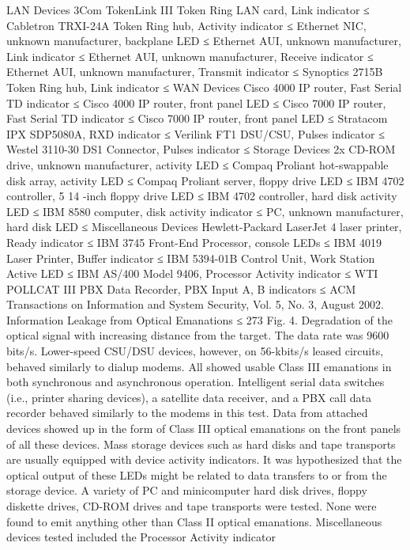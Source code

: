 LAN Devices 
3Com TokenLink III Token Ring LAN card, Link indicator ≤ Cabletron TRXI-24A Token Ring hub, Activity indicator ≤ Ethernet NIC, unknown manufacturer, backplane LED ≤ Ethernet AUI, unknown manufacturer, Link indicator ≤ Ethernet AUI, unknown manufacturer, Receive indicator ≤ Ethernet AUI, unknown manufacturer, Transmit indicator ≤ Synoptics 2715B Token Ring hub, Link indicator ≤ 
WAN Devices 
Cisco 4000 IP router, Fast Serial TD indicator ≤ Cisco 4000 IP router, front panel LED ≤ Cisco 7000 IP router, Fast Serial TD indicator ≤ Cisco 7000 IP router, front panel LED ≤ Stratacom IPX SDP5080A, RXD indicator ≤ Verilink FT1 DSU/CSU, Pulses indicator ≤ Westel 3110-30 DS1 Connector, Pulses indicator ≤ 
Storage Devices 
2x CD-ROM drive, unknown manufacturer, activity LED ≤ Compaq Proliant hot-swappable disk array, activity LED ≤ Compaq Proliant server, floppy drive LED ≤ 
IBM 4702 controller, 5 14 
-inch floppy drive LED ≤ IBM 4702 controller, hard disk activity LED ≤ IBM 8580 computer, disk activity indicator ≤ PC, unknown manufacturer, hard disk LED ≤ 
Miscellaneous Devices 
Hewlett-Packard LaserJet 4 laser printer, Ready indicator ≤ IBM 3745 Front-End Processor, console LEDs ≤ IBM 4019 Laser Printer, Buffer indicator ≤ IBM 5394-01B Control Unit, Work Station Active LED ≤ IBM AS/400 Model 9406, Processor Activity indicator ≤ WTI POLLCAT III PBX Data Recorder, PBX Input A, B 
indicators ≤ 
ACM Transactions on Information and System Security, Vol. 5, No. 3, August 2002.
Information Leakage from Optical Emanations ≤ 273 
Fig. 4. Degradation of the optical signal with increasing distance from the target. The data rate 
was 9600 bits/s. 
Lower-speed CSU/DSU devices, however, on 56-kbits/s leased circuits, behaved 
similarly to dialup modems. All showed usable Class III emanations in both 
synchronous and asynchronous operation. 
Intelligent serial data switches (i.e., printer sharing devices), a satellite data 
receiver, and a PBX call data recorder behaved similarly to the modems in this 
test. Data from attached devices showed up in the form of Class III optical 
emanations on the front panels of all these devices. 
Mass storage devices such as hard disks and tape transports are usually 
equipped with device activity indicators. It was hypothesized that the optical 
output of these LEDs might be related to data transfers to or from the storage 
device. A variety of PC and minicomputer hard disk drives, floppy diskette 
drives, CD-ROM drives and tape transports were tested. None were found to 
emit anything other than Class II optical emanations. 
Miscellaneous devices tested included the Processor Activity indicator 
